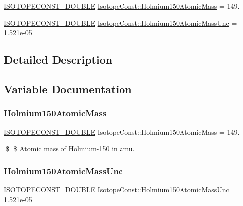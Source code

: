 \begin{DoxyCompactItemize}
\item 
\mbox{\hyperlink{group___isotope_const-_macros_ga8f45a7272ce02c0b4c65c44636ed719a}{I\+S\+O\+T\+O\+P\+E\+C\+O\+N\+S\+T\+\_\+\+D\+O\+U\+B\+LE}} \mbox{\hyperlink{group___isotope_const-_holmium-_ho150_gab36fd05fc49fe9c19cc702e12feb56bc}{Isotope\+Const\+::\+Holmium150\+Atomic\+Mass}} = 149.
\item 
\mbox{\hyperlink{group___isotope_const-_macros_ga8f45a7272ce02c0b4c65c44636ed719a}{I\+S\+O\+T\+O\+P\+E\+C\+O\+N\+S\+T\+\_\+\+D\+O\+U\+B\+LE}} \mbox{\hyperlink{group___isotope_const-_holmium-_ho150_gaa2cd17bc84d80cd7d6e9f562b3bb92e9}{Isotope\+Const\+::\+Holmium150\+Atomic\+Mass\+Unc}} = 1.\+521e-\/05
\end{DoxyCompactItemize}


\subsection{Detailed Description}


\subsection{Variable Documentation}
\mbox{\label{group___isotope_const-_holmium-_ho150_gab36fd05fc49fe9c19cc702e12feb56bc}} 
\subsubsection{\texorpdfstring{Holmium150\+Atomic\+Mass}{Holmium150AtomicMass}}
{\footnotesize\ttfamily \mbox{\hyperlink{group___isotope_const-_macros_ga8f45a7272ce02c0b4c65c44636ed719a}{I\+S\+O\+T\+O\+P\+E\+C\+O\+N\+S\+T\+\_\+\+D\+O\+U\+B\+LE}} Isotope\+Const\+::\+Holmium150\+Atomic\+Mass = 149.}

\$ \$ Atomic mass of Holmium-\/150 in amu. \mbox{\label{group___isotope_const-_holmium-_ho150_gaa2cd17bc84d80cd7d6e9f562b3bb92e9}} 
\subsubsection{\texorpdfstring{Holmium150\+Atomic\+Mass\+Unc}{Holmium150AtomicMassUnc}}
{\footnotesize\ttfamily \mbox{\hyperlink{group___isotope_const-_macros_ga8f45a7272ce02c0b4c65c44636ed719a}{I\+S\+O\+T\+O\+P\+E\+C\+O\+N\+S\+T\+\_\+\+D\+O\+U\+B\+LE}} Isotope\+Const\+::\+Holmium150\+Atomic\+Mass\+Unc = 1.\+521e-\/05}

